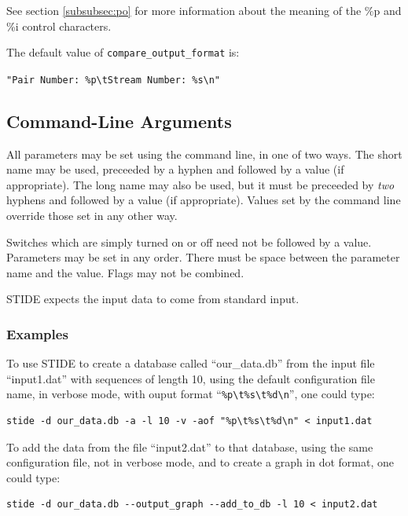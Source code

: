 \documentclass{amsart}
\begin{document}
See section \ref{subsubsec:po} for more information about the meaning
of the \%p and \%i control characters.

The default value of {\tt compare\_output\_format} is:

\vspace{5pt}

\verb+"Pair Number: %p\tStream Number: %s\n"+

\subsection{Command-Line Arguments}
All parameters may be set using the command line, in one of two ways.
The short name may be used, preceeded by a hyphen and followed by a
value (if appropriate).  The long name may also be used, but it must
be preceeded by {\it two} hyphens and followed by a value (if
appropriate).  Values set by the command line override those set in
any other way.

Switches which are simply turned on or off need not be followed by a
value.  Parameters may be set in any order. There must be space
between the parameter name and the value.  Flags may not be combined.

STIDE expects the input data to come from standard input.

\subsubsection{Examples}

To use STIDE to create a database called ``our\_data.db'' from the
input file ``input1.dat'' with sequences of length 10, using the
default configuration file name, in verbose mode, with ouput format
``\verb+%p\t%s\t%d\n+'',  one could type:

\vspace{5pt}

\begin{verbatim}
stide -d our_data.db -a -l 10 -v -aof "%p\t%s\t%d\n" < input1.dat
\end{verbatim}

\vspace{5pt}

To add the data from the file ``input2.dat'' to that database, using
the same configuration file, not in verbose mode, and to create a
graph in dot format, one could type:

\vspace{5pt}

\begin{verbatim}
stide -d our_data.db --output_graph --add_to_db -l 10 < input2.dat
\end{verbatim}
\end{document}
